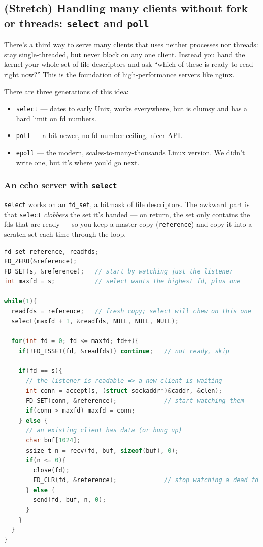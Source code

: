 \documentclass[11pt]{article}
\begin{document}
\subsection*{(Stretch) Handling many clients without fork or threads: \texttt{select} and \texttt{poll}}

There's a third way to serve many clients that uses neither
processes nor threads: stay single-threaded, but never block on any
one client. Instead you hand the kernel your whole set of file
descriptors and ask ``which of these is ready to read right now?''
This is the foundation of high-performance servers like nginx.

There are three generations of this idea:
\begin{itemize}
  \item \texttt{select} --- dates to early Unix, works everywhere,
    but is clumsy and has a hard limit on fd numbers.
  \item \texttt{poll} --- a bit newer, no fd-number ceiling, nicer
    API.
  \item \texttt{epoll} --- the modern, scales-to-many-thousands
    Linux version. We didn't write one, but it's where you'd go
    next.
\end{itemize}

\subsubsection*{An echo server with \texttt{select}}

\texttt{select} works on an \texttt{fd\_set}, a bitmask of file
descriptors. The awkward part is that \texttt{select} \emph{clobbers}
the set it's handed --- on return, the set only contains the fds
that are ready --- so you keep a master copy (\texttt{reference})
and copy it into a scratch set each time through the loop.

\begin{lstlisting}[language=C]
fd_set reference, readfds;
FD_ZERO(&reference);
FD_SET(s, &reference);   // start by watching just the listener
int maxfd = s;           // select wants the highest fd, plus one

while(1){
  readfds = reference;   // fresh copy; select will chew on this one
  select(maxfd + 1, &readfds, NULL, NULL, NULL);

  for(int fd = 0; fd <= maxfd; fd++){
    if(!FD_ISSET(fd, &readfds)) continue;   // not ready, skip

    if(fd == s){
      // the listener is readable => a new client is waiting
      int conn = accept(s, (struct sockaddr*)&caddr, &clen);
      FD_SET(conn, &reference);             // start watching them
      if(conn > maxfd) maxfd = conn;
    } else {
      // an existing client has data (or hung up)
      char buf[1024];
      ssize_t n = recv(fd, buf, sizeof(buf), 0);
      if(n <= 0){
        close(fd);
        FD_CLR(fd, &reference);             // stop watching a dead fd
      } else {
        send(fd, buf, n, 0);
      }
    }
  }
}
\end{lstlisting}
\end{document}
